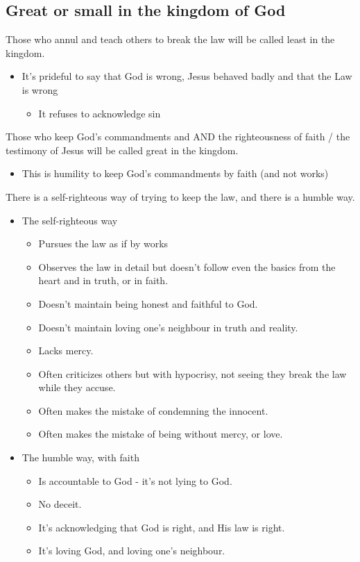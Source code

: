 \documentclass[11pt]{article}
\begin{document}
\subsection{Great or small in the kingdom of God}
\label{sec:orgaa55dba}
Those who annul and teach others to break the law will be called least in the kingdom.
\begin{itemize}
\item It's prideful to say that God is wrong, Jesus behaved badly and that the Law is wrong
\begin{itemize}
\item It refuses to acknowledge sin
\end{itemize}
\end{itemize}
Those who keep God's commandments and AND the righteousness of faith / the testimony of Jesus will be called great in the kingdom.
\begin{itemize}
\item This is humility to keep God's commandments by faith (and not works)
\end{itemize}

There is a self-righteous way of trying to keep the law, and there is a humble way.
\begin{itemize}
\item The self-righteous way
\begin{itemize}
\item Pursues the law as if by works
\item Observes the law in detail but doesn't follow even the basics from the heart and in truth, or in faith.
\item Doesn't maintain being honest and faithful to God.
\item Doesn't maintain loving one's neighbour in truth and reality.
\item Lacks mercy.
\item Often criticizes others but with hypocrisy, not seeing they break the law while they accuse.
\item Often makes the mistake of condemning the innocent.
\item Often makes the mistake of being without mercy, or love.
\end{itemize}
\item The humble way, with faith
\begin{itemize}
\item Is accountable to God - it's not lying to God.
\item No deceit.
\item It's acknowledging that God is right, and His law is right.
\item It's loving God, and loving one's neighbour.
\end{itemize}
\end{itemize}
\end{document}
